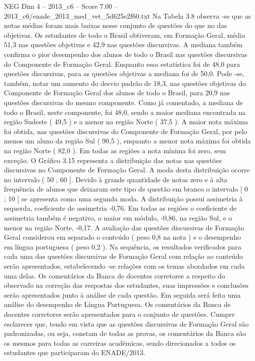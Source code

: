 \begin{textsample}{NEG Dim 4 – 2013\_c6 – Score 7.00 – 2013\_c6/enade\_2013\_med\_vet\_5d625e2f60.txt}
Na Tabela 3.8 observa -se que as notas médias foram mais baixas nesse conjunto de questões do que no das objetivas.
Os estudantes de todo o Brasil obtiveram, em Formação Geral, média 51,3 nas questões objetivas e 42,9 nas questões discursivas.
A mediana também confirma o pior desempenho dos alunos de todo o Brasil nas questões discursivas do Componente de Formação Geral.
Enquanto essa estatística foi de 48,0 para questões discursivas, para as questões objetivas a mediana foi de 50,0.
Pode -se, também, notar um aumento do desvio padrão de 18,3, nas questões objetivas do Componente de Formação Geral dos alunos de todo o Brasil, para 20,9 nas questões discursivas do mesmo componente.
Como já comentado, a mediana de todo o Brasil, neste componente, foi 48,0, sendo a maior mediana encontrada na região Sudeste ( 49,5 ) e a menor na região Norte ( 37,5 ).
A maior nota máxima foi obtida, nas questões discursivas do Componente de Formação Geral, por pelo menos um aluno da região Sul ( 90,5 ), enquanto a menor nota máxima foi obtida na região Norte ( 82,0 ).
Em todas as regiões a nota mínima foi zero, sem exceção.
O Gráfico 3.15 representa a distribuição das notas nas questões discursivas no Componente de Formação Geral.
A moda desta distribuição ocorre no intervalo ( 50 ; 60 ].
Devido à grande quantidade de notas zero e à alta frequência de alunos que deixaram este tipo de questão em branco o intervalo [ 0 ; 10 ] se apresenta como uma segunda moda.
A distribuição possui assimetria à esquerda, coeficiente de assimetria -0,76.
Em todas as regiões o coeficiente de assimetria também é negativo, o maior em módulo, -0,86, na região Sul, e o menor na região Norte, -0,17.
A avaliação das questões discursivas de Formação Geral considerou em separado o conteúdo ( peso 0,8 na nota ) e o desempenho em língua portuguesa ( peso 0,2 ).
Na sequência, os resultados verificados para cada uma das questões discursivas de Formação Geral com relação ao conteúdo serão apresentados, estabelecendo -se relações com os temas abordados em cada uma delas.
Os comentários da Banca de docentes corretores a respeito do observado na correção das respostas dos estudantes, suas impressões e conclusões serão apresentados junto à análise de cada questão.
Em seguida será feita uma análise do desempenho de Língua Portuguesa.
Os comentários da Banca de docentes corretores serão apresentados para o conjunto de questões.
Cumpre esclarecer que, tendo em vista que as questões discursivas de Formação Geral são padronizadas, ou seja, constam de todas as provas, os comentários da Banca são os mesmos para todas as carreiras acadêmicas, sendo direcionados a todos os estudantes que participaram do ENADE/2013.

\end{textsample}
